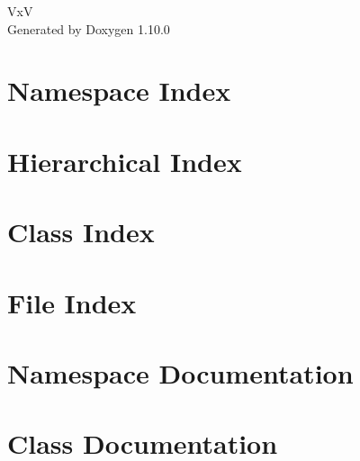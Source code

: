 \documentclass[twoside]{book}
\newcommand{\+}{\discretionary{\mbox{\scriptsize$\hookleftarrow$}}{}{}}
\newcommand{\clearemptydoublepage}{%
    \newpage{\pagestyle{empty}\cleardoublepage}%
  }
\begin{document}
  \raggedbottom
    \hypersetup{pageanchor=false,
                bookmarksnumbered=true,
                pdfencoding=unicode
               }
  \begin{titlepage}
  \vspace*{7cm}
  \begin{center}%
  {\Large VxV}\\
  \vspace*{1cm}
  {\large Generated by Doxygen 1.10.0}\\
  \end{center}
  \end{titlepage}
  \clearemptydoublepage
  \tableofcontents
  \clearemptydoublepage
  \hypersetup{pageanchor=true}

\chapter{Namespace Index}

\chapter{Hierarchical Index}

\chapter{Class Index}

\chapter{File Index}

\chapter{Namespace Documentation}


\chapter{Class Documentation}
































\end{document}
